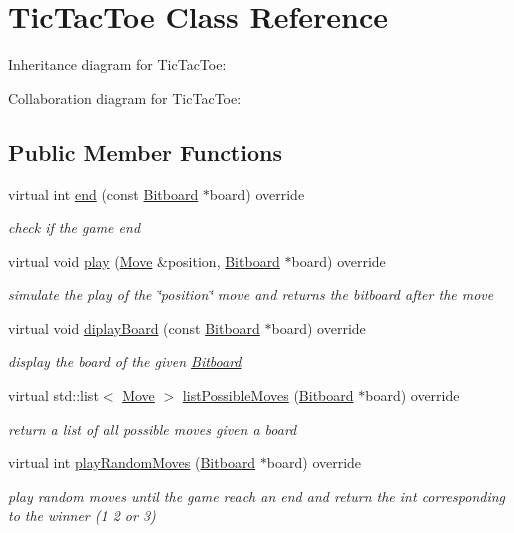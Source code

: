 \hypertarget{class_tic_tac_toe}{\section{Tic\+Tac\+Toe Class Reference}
\label{class_tic_tac_toe}
}


Inheritance diagram for Tic\+Tac\+Toe\+:


Collaboration diagram for Tic\+Tac\+Toe\+:
\subsection*{Public Member Functions}
\begin{DoxyCompactItemize}
\item 
virtual int \hyperlink{class_tic_tac_toe_a5c97bc150240f2868493b926771b8297}{end} (const \hyperlink{class_bitboard}{Bitboard} $\ast$board) override
\begin{DoxyCompactList}\small\item\em check if the game end \end{DoxyCompactList}\item 
virtual void \hyperlink{class_tic_tac_toe_a51de7ce22df10cacab5be69d9e431c44}{play} (\hyperlink{class_move}{Move} \&position, \hyperlink{class_bitboard}{Bitboard} $\ast$board) override
\begin{DoxyCompactList}\small\item\em simulate the play of the \char`\"{}position\char`\"{} move and returns the bitboard after the move \end{DoxyCompactList}\item 
virtual void \hyperlink{class_tic_tac_toe_ac1544a9b625909d11d0d308161677779}{diplay\+Board} (const \hyperlink{class_bitboard}{Bitboard} $\ast$board) override
\begin{DoxyCompactList}\small\item\em display the board of the given \hyperlink{class_bitboard}{Bitboard} \end{DoxyCompactList}\item 
virtual std\+::list$<$ \hyperlink{class_move}{Move} $>$ \hyperlink{class_tic_tac_toe_ae5435ac05cdc9490b5aecf419da62d54}{list\+Possible\+Moves} (\hyperlink{class_bitboard}{Bitboard} $\ast$board) override
\begin{DoxyCompactList}\small\item\em return a list of all possible moves given a board \end{DoxyCompactList}\item 
virtual int \hyperlink{class_tic_tac_toe_a9e280ccffa371b9ef001cbfbeb233d84}{play\+Random\+Moves} (\hyperlink{class_bitboard}{Bitboard} $\ast$board) override
\begin{DoxyCompactList}\small\item\em play random moves until the game reach an end and return the int corresponding to the winner (1 2 or 3) \end{DoxyCompactList}\end{DoxyCompactItemize}


